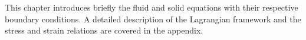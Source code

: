 This chapter introduces briefly the fluid and solid equations with their respective boundary conditions. A detailed description of the Lagrangian framework and the stress and strain relations are covered in the appendix.






\begin{comment}
Let $\Omega \in \mathbb{R}^d $ for $d \in \{1,2\}$, be a bounded domain with boundary $ \partial \Omega$. The domain is made up of of two sub domains $ \mathcal{F} $ for the fluid domain, and $\mathcal{S}$ for the solid. The interface between the domains are denoted by $ \Sigma = \mathcal{F} \cap \mathcal{S} $. The reference or initial is denoted by $ \hat{\Sigma} = \hat{\mathcal{F}} \cap \hat{\mathcal{S}}  $ 
\end{comment}

